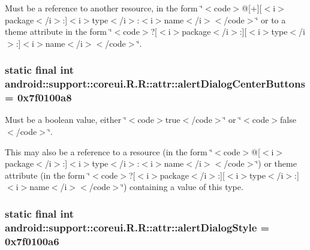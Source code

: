 Must be a reference to another resource, in the form \char`\"{}$<$code$>$@\mbox{[}+\mbox{]}\mbox{[}$<$i$>$package$<$/i$>$:\mbox{]}$<$i$>$type$<$/i$>$:$<$i$>$name$<$/i$>$$<$/code$>$\char`\"{} or to a theme attribute in the form \char`\"{}$<$code$>$?\mbox{[}$<$i$>$package$<$/i$>$:\mbox{]}\mbox{[}$<$i$>$type$<$/i$>$:\mbox{]}$<$i$>$name$<$/i$>$$<$/code$>$\char`\"{}. \hypertarget{classandroid_1_1support_1_1coreui_1_1_r_1_1attr_b39ba2ad4441b2ff68e2eccdb26189e0}{
\subsubsection[{alertDialogCenterButtons}]{\setlength{\rightskip}{0pt plus 5cm}static final int android::support::coreui.R.R::attr::alertDialogCenterButtons = 0x7f0100a8}}
\label{classandroid_1_1support_1_1coreui_1_1_r_1_1attr_b39ba2ad4441b2ff68e2eccdb26189e0}


Must be a boolean value, either \char`\"{}$<$code$>$true$<$/code$>$\char`\"{} or \char`\"{}$<$code$>$false$<$/code$>$\char`\"{}. 

This may also be a reference to a resource (in the form \char`\"{}$<$code$>$@\mbox{[}$<$i$>$package$<$/i$>$:\mbox{]}$<$i$>$type$<$/i$>$:$<$i$>$name$<$/i$>$$<$/code$>$\char`\"{}) or theme attribute (in the form \char`\"{}$<$code$>$?\mbox{[}$<$i$>$package$<$/i$>$:\mbox{]}\mbox{[}$<$i$>$type$<$/i$>$:\mbox{]}$<$i$>$name$<$/i$>$$<$/code$>$\char`\"{}) containing a value of this type. \hypertarget{classandroid_1_1support_1_1coreui_1_1_r_1_1attr_1ba68e6e7ff1a8fbdc8bf0d0b66c6d41}{
\subsubsection[{alertDialogStyle}]{\setlength{\rightskip}{0pt plus 5cm}static final int android::support::coreui.R.R::attr::alertDialogStyle = 0x7f0100a6}}
\label{classandroid_1_1support_1_1coreui_1_1_r_1_1attr_1ba68e6e7ff1a8fbdc8bf0d0b66c6d41}


